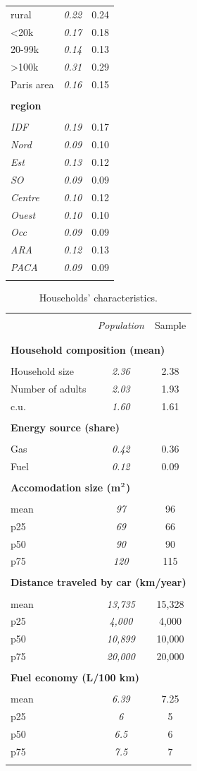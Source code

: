\documentclass[english,5p,authoryear]{elsarticle}
\begin{document}
\begin{appendices}
\begin{table}[!htbp]
\begin{tabular}{lcc}
rural & \textit{0.22} & 0.24\tabularnewline
<20k & \textit{0.17} & 0.18\tabularnewline
20-99k & \textit{0.14} & 0.13\tabularnewline
>100k & \textit{0.31} & 0.29\tabularnewline
Paris area & \textit{0.16} & 0.15\tabularnewline
\hline  \\[-1.8ex]
\textbf{region} &  & \tabularnewline  \\[-1.8ex]
\textit{IDF} & \textit{0.19} & 0.17\tabularnewline
 \textit{Nord} & \textit{0.09} & 0.10\tabularnewline
 \textit{Est} & \textit{0.13} & 0.12\tabularnewline
\textit{SO} & \textit{0.09} & 0.09\tabularnewline
\textit{Centre} & \textit{0.10} & 0.12\tabularnewline
 \textit{Ouest} & \textit{0.10} & 0.10\tabularnewline
 \textit{Occ} & \textit{0.09} & 0.09\tabularnewline
\textit{ARA} & \textit{0.12} & 0.13\tabularnewline
\textit{PACA} & \textit{0.09} & 0.09\tabularnewline  \\[-1.8ex]
\hline \hline 
\end{tabular}\bigskip{}
\end{table}


\begin{table}[!htbp]
    \caption{Households' characteristics.\label{tab:app-energetic-characs}}
\centering
\begin{tabular}{lcc}
\hline \hline  \\[-1.8ex]
 & \textit{Population} & Sample  \tabularnewline \\[-1.8ex]
\hline  \\[-1.8ex]
\multicolumn{3}{l}{\textbf{Household composition (mean)}} \tabularnewline  \\[-1.8ex]
Household size & \textit{2.36} & 2.38\tabularnewline
Number of adults & \textit{2.03} & 1.93\tabularnewline
c.u. & \textit{1.60} & 1.61\tabularnewline
\hline   \\[-1.8ex]
\multicolumn{3}{l}{\textbf{Energy source (share)}} \tabularnewline  \\[-1.8ex]
Gas & \textit{0.42} & 0.36\tabularnewline
Fuel & \textit{0.12} & 0.09\tabularnewline
\hline   \\[-1.8ex]
\multicolumn{3}{l}{\textbf{Accomodation size (m$^\textnormal{2}$)}} \tabularnewline  \\[-1.8ex]
mean & \textit{97} & 96\tabularnewline
p25 & \textit{69} & 66\tabularnewline
p50 & \textit{90} & 90\tabularnewline
p75 & \textit{120} & 115\tabularnewline
\hline   \\[-1.8ex]
\multicolumn{3}{l}{\textbf{Distance traveled by car (km/year)}} \tabularnewline  \\[-1.8ex]
mean & \textit{13,735} & 15,328\tabularnewline
p25 & \textit{4,000} & 4,000\tabularnewline
p50 & \textit{10,899} & 10,000 \tabularnewline
p75 & \textit{20,000 } & 20,000 \tabularnewline
\hline   \\[-1.8ex]
\multicolumn{3}{l}{\textbf{Fuel economy (L/100 km)}} \tabularnewline  \\[-1.8ex]
mean & \textit{6.39} & 7.25\tabularnewline
p25 & \textit{6} & 5\tabularnewline
p50 & \textit{6.5} & 6\tabularnewline
p75 & \textit{7.5} & 7\tabularnewline  \\[-1.8ex]
\hline \hline 
\end{tabular}\bigskip{}


\end{table}
\end{appendices}
\end{document}
